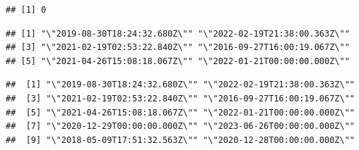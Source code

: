 \documentclass[
]{article}
\newenvironment{Shaded}{\begin{snugshade}}{\end{snugshade}}
\newcommand{\AttributeTok}[1]{\textcolor[rgb]{0.13,0.29,0.53}{#1}}
\newcommand{\CommentTok}[1]{\textcolor[rgb]{0.56,0.35,0.01}{\textit{#1}}}
\newcommand{\ConstantTok}[1]{\textcolor[rgb]{0.56,0.35,0.01}{#1}}
\newcommand{\DecValTok}[1]{\textcolor[rgb]{0.00,0.00,0.81}{#1}}
\newcommand{\FunctionTok}[1]{\textcolor[rgb]{0.13,0.29,0.53}{\textbf{#1}}}
\newcommand{\NormalTok}[1]{#1}
\newcommand{\OtherTok}[1]{\textcolor[rgb]{0.56,0.35,0.01}{#1}}
\newcommand{\SpecialCharTok}[1]{\textcolor[rgb]{0.81,0.36,0.00}{\textbf{#1}}}
\newcommand{\StringTok}[1]{\textcolor[rgb]{0.31,0.60,0.02}{#1}}
\begin{document}
\begin{Shaded}
\end{Shaded}

\begin{verbatim}
## [1] 0
\end{verbatim}

\begin{Shaded}
\end{Shaded}

\begin{verbatim}
## [1] "\"2019-08-30T18:24:32.680Z\"" "\"2022-02-19T21:38:00.363Z\""
## [3] "\"2021-02-19T02:53:22.840Z\"" "\"2016-09-27T16:00:19.067Z\""
## [5] "\"2021-04-26T15:08:18.067Z\"" "\"2022-01-21T00:00:00.000Z\""
\end{verbatim}

\begin{Shaded}
\end{Shaded}

\begin{verbatim}
##  [1] "\"2019-08-30T18:24:32.680Z\"" "\"2022-02-19T21:38:00.363Z\""
##  [3] "\"2021-02-19T02:53:22.840Z\"" "\"2016-09-27T16:00:19.067Z\""
##  [5] "\"2021-04-26T15:08:18.067Z\"" "\"2022-01-21T00:00:00.000Z\""
##  [7] "\"2020-12-29T00:00:00.000Z\"" "\"2023-06-26T00:00:00.000Z\""
##  [9] "\"2018-05-09T17:51:32.563Z\"" "\"2020-12-28T00:00:00.000Z\""
\end{verbatim}

\begin{Shaded}
\end{Shaded}
\end{document}
